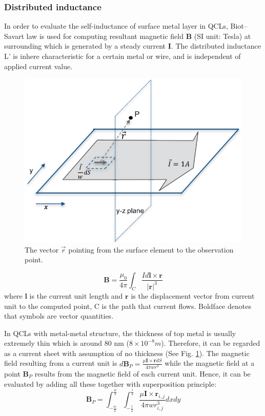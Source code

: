 \documentclass[11pt,final]{scrbook}
\begin{document}
\subsubsection{Distributed inductance}
In order to evaluate the self-inductance of surface metal layer in QCLs, Biot–Savart law \cite{grant2013electromagnetism} is used for computing resultant magnetic field $\textbf{B}$ (SI unit: Tesla) at surrounding which is generated by a steady current $\textbf{I}$. The distributed inductance L' is inhere characteristic for a certain metal or wire, and is independent of applied current value.
 \begin{figure}[htbp]
\begin{center}
\includegraphics[scale=0.9]{images/TL_L(2).pdf}
\caption{The vector $\vec{ r } $ pointing from the surface element to the observation point.}
\label{fig:TL_L(2)}
\end{center}
\end{figure}

\begin{equation}
\textbf{B}=\frac{\mu_{0}}{4\pi}\int _{ C }{ \frac { Id\textbf{l}\times \textbf{r} }{ |\textbf{r}| ^{3}}}
\end{equation}
where $\textbf{l}$ is the current unit length and $\textbf{r}$ is the displacement vector from current unit to the computed point, C is the path that current flows. Boldface denotes that symbols are vector quantities.

In QCLs with metal-metal structure, the thickness of top metal is usually extremely thin which is around 80 nm ($8\times 10^{-8} m$). Therefore, it can be regarded as a current sheet with assumption of no thickness (See Fig. \ref{fig:TL_L(2)}). The magnetic field resulting from a current unit is $d\textbf{B}_{P}=\frac { \mu \textbf{I}\times { \textbf{r}}dS }{ 4\pi w{ r }^{ 3 }}$ while the magnetic field at a point $ \textbf{B}_{P}$ results from the magnetic field of each current unit. Hence, it can be evaluated by adding all these together with superposition principle:
\begin{equation}
 \textbf{B}_{P}=\int _{ -\frac { w }{ 2 }  }^{ \frac { w }{ 2 }  }{ \int _{ -\frac { l }{ 2 }  }^{ \frac { l }{ 2 }  }{ { \frac { \mu { \textbf{I} }\times { { \textbf{r} } }_{ i,j } }{ 4\pi w{ r }_{ i,j }^{ 3 } }  } }  } dxdy
\end{equation}
\end{document}
